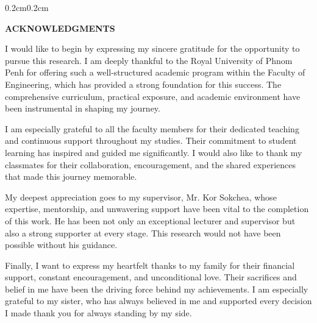 \begin{adjustwidth}{0.2cm}{0.2cm}
\englishfont\fontsize{13.5pt}{17pt}\selectfont 


\begin{center}
    {\englishfont\fontsize{14pt}{21pt}\selectfont \textbf{ACKNOWLEDGMENTS} \par}
\end{center}
\label{acknowledgements}

\vspace{0.1cm}
\setlength{\parindent}{0pt}
\vspace{0.3cm}


{\large     I would like to begin by expressing my sincere gratitude for the opportunity to pursue this research. I am deeply thankful to the Royal University of Phnom Penh for offering such a well-structured academic program within the Faculty of Engineering, which has provided a strong foundation for this success. The comprehensive curriculum, practical exposure, and academic environment have been instrumental in shaping my journey.

\vspace{0.5cm}
I am especially grateful to all the faculty members for their dedicated teaching and continuous support throughout my studies. Their commitment to student learning has inspired and guided me significantly. I would also like to thank my classmates for their collaboration, encouragement, and the shared experiences that made this journey memorable.

\vspace{0.5cm}
My deepest appreciation goes to my supervisor, Mr. Kor Sokchea, whose expertise, mentorship, and unwavering support have been vital to the completion of this work. He has been not only an exceptional lecturer and supervisor but also a strong supporter at every stage. This research would not have been possible without his guidance.

\vspace{0.5cm}
Finally, I want to express my heartfelt thanks to my family for their financial support, constant encouragement, and unconditional love. Their sacrifices and belief in me have been the driving force behind my achievements. I am especially grateful to my sister, who has always believed in me and supported every decision I made thank you for always standing by my side.

\par}

\end{adjustwidth}
